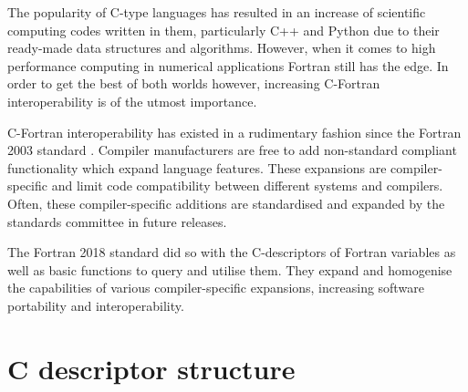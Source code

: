 The popularity of C-type languages has resulted in an increase of scientific computing codes written in them, particularly C++ and Python due to their ready-made data structures and algorithms. However, when it comes to high performance computing in numerical applications Fortran still has the edge. In order to get the best of both worlds however, increasing C-Fortran interoperability is of the utmost importance.

C-Fortran interoperability has existed in a rudimentary fashion since the Fortran 2003 standard \cite{fortran}. Compiler manufacturers are free to add non-standard compliant functionality which expand language features. These expansions are compiler-specific and limit code compatibility between different systems and compilers. Often, these compiler-specific additions are standardised and expanded by the standards committee in future releases.

The Fortran 2018 standard did so with the C-descriptors of Fortran variables as well as basic functions to query and utilise them. They expand and homogenise the capabilities of various compiler-specific expansions, increasing software portability and interoperability.

\section{C descriptor structure}


